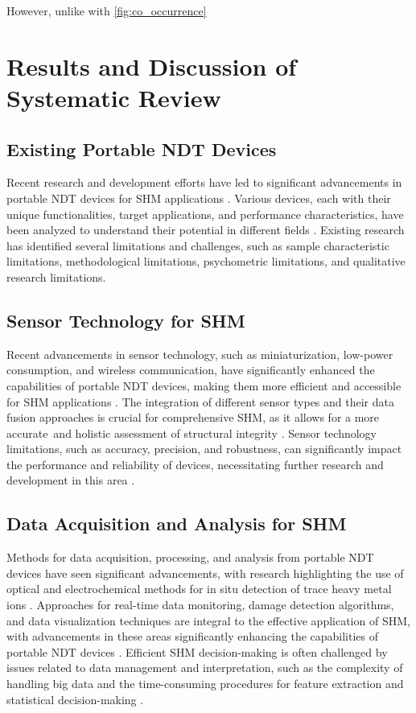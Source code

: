 \documentclass[journal, a4paper]{IEEEtran}
\begin{document}
However, unlike with \autoref{fig:co_occurrence} \lipsum[1]






\section{Results and Discussion of Systematic Review}

\subsection{Existing Portable NDT Devices}
Recent research and development efforts have led to significant advancements in portable NDT devices
for SHM applications \cite{Vijayan2023} \cite{Parsy2018} \cite{Hassani2023}.
Various devices, each with their unique functionalities, target applications, and performance characteristics,
have been analyzed to understand their potential in different fields \cite{Khanna2020} \cite{Baig2021} \cite{Corzo2020}.
Existing research has identified several limitations and challenges, such as sample characteristic limitations,
methodological limitations, psychometric limitations, and qualitative research limitations.


\subsection{Sensor Technology for SHM}
Recent advancements in sensor technology, such as miniaturization, low-power consumption, and wireless communication,
have significantly enhanced the capabilities of portable NDT devices,
making them more efficient and accessible for SHM applications \cite{Hassani2023} \cite{Valeske2020}.
The integration of different sensor types and their data fusion approaches is crucial
for comprehensive SHM, as it allows for a more accurate\
and holistic assessment of structural integrity \cite{Broer2022} \cite{Azimi2020}.
Sensor technology limitations, such as accuracy, precision, and robustness,
can significantly impact the performance and reliability of devices,
necessitating further research and development in this area \cite{Varshney2021} \cite{Moore2020}.


\subsection{Data Acquisition and Analysis for SHM}
Methods for data acquisition, processing, and analysis from portable NDT
devices have seen significant advancements, with research highlighting the use of optical
and electrochemical methods for in situ detection of trace heavy metal ions \cite{Hu2023}.
Approaches for real-time data monitoring, damage detection algorithms, and data visualization techniques
are integral to the effective application of SHM, with advancements in these areas
significantly enhancing the capabilities of portable NDT devices \cite{Azimi2020} \cite{Lingxin2022}.
Efficient SHM decision-making is often challenged by issues related
to data management and interpretation, such as the complexity of handling big data and the time-consuming procedures
for feature extraction and statistical decision-making \cite{Entezami2020}.
\end{document}
